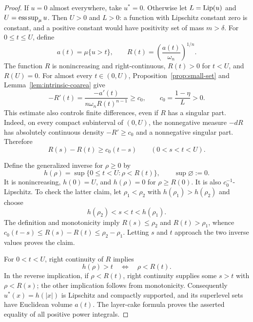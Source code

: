 \begin{proof}
If $u=0$ almost everywhere, take $u^*=0$.  Otherwise let
$L=\operatorname{Lip}(u)$ and $U=\operatorname*{ess\,sup}_\mu u$.  Then $U>0$ and $L>0$: a function
with Lipschitz constant zero is constant, and a positive constant
would have positivity set of mass $m>\delta$.
For $0\le t\le U$, define
\[
 a(t)=\mu\{u>t\},\qquad
 R(t)=\left(\frac{a(t)}{\omega_n}\right)^{1/n}.
\]
The function $R$ is nonincreasing and right-continuous,
$R(t)>0$ for $t<U$, and $R(U)=0$.
For almost every $t\in(0,U)$, Proposition~\ref{prop:small-set} and
Lemma~\ref{lem:intrinsic-coarea} give
\begin{equation}
 -R'(t)=\frac{-a'(t)}{n\omega_n R(t)^{n-1}}
      \ge c_0,\qquad c_0=\frac{1-\eta}{L}>0.
 \label{eq:radius-distribution-slope}
\end{equation}
This estimate also controls finite differences, even if $R$ has a
singular part.  Indeed, on every compact subinterval of $(0,U)$,
the nonnegative measure $-dR$ has absolutely continuous density
$-R'\ge c_0$ and a nonnegative singular part.  Therefore
\begin{equation}
 R(s)-R(t)\ge c_0(t-s)
 \qquad(0<s<t<U).
 \label{eq:radius-distribution-difference}
\end{equation}

Define the generalized inverse for $\rho\ge0$ by
\begin{equation}
 h(\rho)=\sup\{0\le t<U:\rho<R(t)\},
 \qquad \sup\varnothing:=0.
 \label{eq:generalized-inverse}
\end{equation}
It is nonincreasing, $h(0)=U$, and $h(\rho)=0$ for
$\rho\ge R(0)$.  It is also $c_0^{-1}$-Lipschitz.  To check the latter
claim, let $\rho_1<\rho_2$ with $h(\rho_1)>h(\rho_2)$ and choose
\[
 h(\rho_2)<s<t<h(\rho_1).
\]
The definition and monotonicity imply
$R(s)\le\rho_2$ and $R(t)>\rho_1$, whence
$c_0(t-s)\le R(s)-R(t)\le\rho_2-\rho_1$.
Letting $s$ and $t$ approach the two inverse values proves the claim.

For $0<t<U$, right continuity of $R$ implies
\begin{equation}
 h(\rho)>t\quad\Longleftrightarrow\quad \rho<R(t).
 \label{eq:inverse-superlevels}
\end{equation}
In the reverse implication, if $\rho<R(t)$, right continuity supplies
some $s>t$ with $\rho<R(s)$; the other implication follows from
monotonicity.  Consequently $u^*(x)=h(|x|)$ is Lipschitz and compactly
supported, and its superlevel sets have Euclidean volume $a(t)$.
The layer-cake formula proves the asserted equality of all positive
power integrals.


\end{proof}
